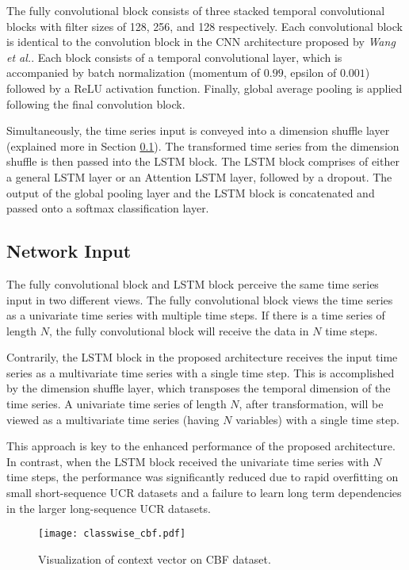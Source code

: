 \documentclass[article]{IEEEtran}
\begin{document}
The fully convolutional block consists of three stacked temporal convolutional blocks with filter sizes of 128, 256, and 128 respectively. Each convolutional block is identical to the convolution block in the CNN architecture proposed by \textit{Wang et al.}\cite{wang2017time}. Each block consists of a temporal convolutional layer, which is accompanied by batch normalization \cite{ioffe2015batch} (momentum of $0.99$, epsilon of $0.001$) followed by a ReLU activation function. Finally, global average pooling is applied following the final convolution block. 

Simultaneously, the time series input is conveyed into a dimension shuffle layer (explained more in Section \ref{net_input}). The transformed time series from the dimension shuffle is then passed into the LSTM block. The LSTM block comprises of either a general LSTM layer or an Attention LSTM layer, followed by a dropout. The output of the global pooling layer and the LSTM block is concatenated and passed onto a softmax classification layer.
 
\subsection{Network Input}
\label{net_input}
The fully convolutional block and LSTM block perceive the same time series input in two different views. The fully convolutional block views the time series as a univariate time series with multiple time steps. If there is a time series of length $N$, the fully convolutional block will receive the data in $N$ time steps. 

Contrarily, the LSTM block in the proposed architecture receives the input time series as a multivariate time series with a single time step. This is accomplished by the dimension shuffle layer, which transposes the temporal dimension of the time series. A univariate time series of length $N$, after transformation, will be viewed as a multivariate time series (having $N$ variables) with a single time step. 

This approach is key to the enhanced performance of the proposed architecture. In contrast, when the LSTM block received the univariate time series with $N$ time steps, the performance was significantly reduced due to rapid overfitting on small short-sequence UCR datasets and a failure to learn long term dependencies in the larger long-sequence UCR datasets.  
\begin{figure*}
\center
\texttt{[image: classwise\_cbf.pdf]}
\caption{Visualization of context vector on CBF dataset.}
\label{fig:attention_cbf}
\center
\end{figure*}
\end{document}
